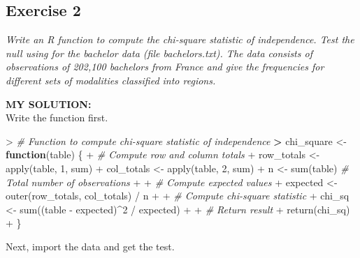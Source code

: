 \documentclass[
]{article}
\newenvironment{Shaded}{\begin{snugshade}}{\end{snugshade}}
\newcommand{\CommentTok}[1]{\textcolor[rgb]{0.56,0.35,0.01}{\textit{#1}}}
\newcommand{\ControlFlowTok}[1]{\textcolor[rgb]{0.13,0.29,0.53}{\textbf{#1}}}
\newcommand{\DecValTok}[1]{\textcolor[rgb]{0.00,0.00,0.81}{#1}}
\newcommand{\ErrorTok}[1]{\textcolor[rgb]{0.64,0.00,0.00}{\textbf{#1}}}
\newcommand{\FunctionTok}[1]{\textcolor[rgb]{0.00,0.00,0.00}{#1}}
\newcommand{\NormalTok}[1]{#1}
\newcommand{\OtherTok}[1]{\textcolor[rgb]{0.56,0.35,0.01}{#1}}
\newcommand{\SpecialCharTok}[1]{\textcolor[rgb]{0.00,0.00,0.00}{#1}}
\begin{document}
\hypertarget{exercise-2}{%
\subsection{Exercise 2}\label{exercise-2}}

\emph{Write an R function to compute the chi-square statistic of
independence. Test the null using for the bachelor data (file
bachelors.txt). The data consists of observations of 202,100 bachelors
from France and give the frequencies for different sets of modalities
classified into regions.}

\textbf{MY SOLUTION:}\\
Write the function first.

\begin{Shaded}
\begin{Highlighting}[]
\SpecialCharTok{\textgreater{}} \CommentTok{\# Function to compute chi{-}square statistic of independence}
\ErrorTok{\textgreater{}}\NormalTok{ chi\_square }\OtherTok{\textless{}{-}} \ControlFlowTok{function}\NormalTok{(table) \{}
\SpecialCharTok{+}   \CommentTok{\# Compute row and column totals}
\SpecialCharTok{+}\NormalTok{   row\_totals }\OtherTok{\textless{}{-}} \FunctionTok{apply}\NormalTok{(table, }\DecValTok{1}\NormalTok{, sum)}
\SpecialCharTok{+}\NormalTok{   col\_totals }\OtherTok{\textless{}{-}} \FunctionTok{apply}\NormalTok{(table, }\DecValTok{2}\NormalTok{, sum)}
\SpecialCharTok{+}\NormalTok{   n }\OtherTok{\textless{}{-}} \FunctionTok{sum}\NormalTok{(table) }\CommentTok{\# Total number of observations}
\SpecialCharTok{+}   
\SpecialCharTok{+}   \CommentTok{\# Compute expected values}
\SpecialCharTok{+}\NormalTok{   expected }\OtherTok{\textless{}{-}} \FunctionTok{outer}\NormalTok{(row\_totals, col\_totals) }\SpecialCharTok{/}\NormalTok{ n}
\SpecialCharTok{+}   
\SpecialCharTok{+}   \CommentTok{\# Compute chi{-}square statistic}
\SpecialCharTok{+}\NormalTok{   chi\_sq }\OtherTok{\textless{}{-}} \FunctionTok{sum}\NormalTok{((table }\SpecialCharTok{{-}}\NormalTok{ expected)}\SpecialCharTok{\^{}}\DecValTok{2} \SpecialCharTok{/}\NormalTok{ expected)}
\SpecialCharTok{+}   
\SpecialCharTok{+}   \CommentTok{\# Return result}
\SpecialCharTok{+}   \FunctionTok{return}\NormalTok{(chi\_sq)}
\SpecialCharTok{+}\NormalTok{ \}}
\end{Highlighting}
\end{Shaded}

Next, import the data and get the test.
\end{document}

